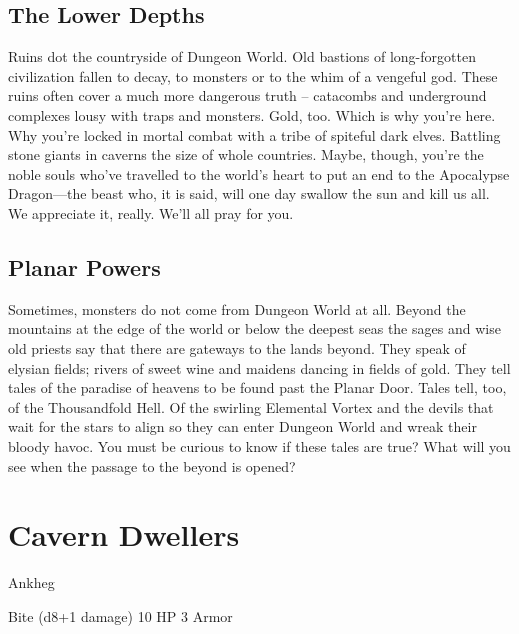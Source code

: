        
\subsection{The Lower Depths}   
       

Ruins dot the countryside of Dungeon World. Old bastions of long-forgotten civilization fallen to decay, to monsters or to the whim of a vengeful god. These ruins often cover a much more dangerous truth – catacombs and underground complexes lousy with traps and monsters. Gold, too. Which is why you're here. Why you're locked in mortal combat with a tribe of spiteful dark elves. Battling stone giants in caverns the size of whole countries. Maybe, though, you're the noble souls who've travelled to the world's heart to put an end to the Apocalypse Dragon—the beast who, it is said, will one day swallow the sun and kill us all. We appreciate it, really. We'll all pray for you.

       
\subsection{Planar Powers}    
       

Sometimes, monsters do not come from Dungeon World at all. Beyond the mountains at the edge of the world or below the deepest seas the sages and wise old priests say that there are gateways to the lands beyond. They speak of elysian fields; rivers of sweet wine and maidens dancing in fields of gold. They tell tales of the paradise of heavens to be found past the Planar Door. Tales tell, too, of the Thousandfold Hell. Of the swirling Elemental Vortex and the devils that wait for the stars to align so they can enter Dungeon World and wreak their bloody havoc. You must be curious to know if these tales are true? What will you see when the passage to the beyond is opened?

                
\section{Cavern Dwellers}    
            
\startMonsterName
Ankheg	 
\stopMonsterName
       

Bite (d8+1 damage)	10 HP	3 Armor

       



